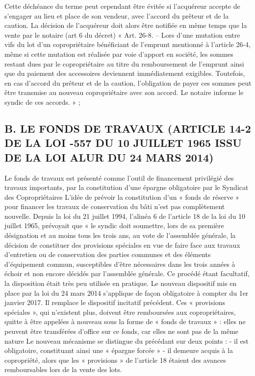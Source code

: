 			Cette déchéance du terme peut cependant être évitée si l’acquéreur accepte de s’engager au lieu et place de son vendeur, avec l’accord du prêteur et de la caution. La décision de l’acquéreur doit alors être notifiée en même temps que la vente par le notaire (art 6 du décret)
			« Art. 26-8. – Lors d’une mutation entre vifs du lot d’un copropriétaire bénéficiant de l’emprunt mentionné à l’article 26-4, même si cette mutation est réalisée par voie d’apport en société, les sommes restant dues par le copropriétaire au titre du remboursement de l’emprunt ainsi que du paiement des accessoires deviennent immédiatement exigibles. Toutefois, en cas d’accord du prêteur et de la caution, l’obligation de payer ces sommes peut être transmise au nouveau copropriétaire avec son accord. Le notaire informe le syndic de ces accords. » ;
	
	\subsection{B. LE FONDS DE TRAVAUX (ARTICLE 14-2 DE LA LOI -557 DU 10 JUILLET 1965 ISSU DE LA LOI ALUR DU 24 MARS 2014)}
	
		Le fonds de travaux est présenté comme l’outil de financement privilégié des travaux importants, par la constitution d’une épargne obligatoire par le Syndicat des Copropriétaires
		L’idée de prévoir la constitution d’un « fonds de réserve » pour financer les travaux de conservation du bâti n’est pas complètement nouvelle. Depuis la loi du 21 juillet 1994, l’alinéa 6 de l’article 18 de la loi du 10 juillet 1965, prévoyait que « le syndic doit soumettre, lors de sa première désignation et au moins tous les trois ans, au vote de l'assemblée générale, la décision de constituer des provisions spéciales en vue de faire face aux travaux d'entretien ou de conservation des parties communes et des éléments d'équipement commun, susceptibles d'être nécessaires dans les trois années à échoir et non encore décidés par l'assemblée générale. Ce procédé étant facultatif, la disposition était très peu utilisée en pratique.
		Le nouveau dispositif mis en place par la loi du 24 mars 2014 s’applique de façon obligatoire à compter du 1er janvier 2017. Il remplace le dispositif incitatif précédent. Ces « provisions spéciales », qui n’existent plus, doivent être remboursées aux copropriétaires, quitte à être
		appelées à nouveau sous la forme de « fonds de travaux » : elles ne peuvent être transférées d’office sur ce fonds, car elles ne sont pas de la même nature
		Le nouveau mécanisme se distingue du précédant sur deux points :
		- il est obligatoire, constituant ainsi une « épargne forcée »
		- il demeure acquis à la copropriété, alors que les « provisions » de l’article 18 étaient des avances remboursables lors de la vente des lots.
		
